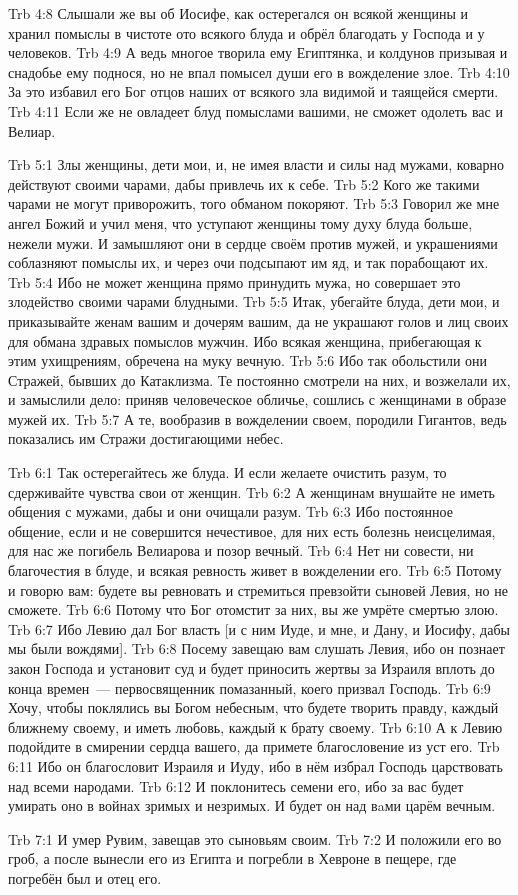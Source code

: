\vs Trb 4:8
Слышали же вы об Иосифе, как остерегался он всякой женщины
и хранил помыслы в чистоте ото всякого блуда и обрёл
благодать у Господа и у человеков.
\vs Trb 4:9
А ведь многое творила ему Египтянка, и колдунов призывая
и снадобье ему поднося, но не впал помысел души его
в вожделение злое.
\vs Trb 4:10
За это избавил его Бог отцов наших от всякого зла видимой
и таящейся смерти.
\vs Trb 4:11
Если же не овладеет блуд помыслами вашими, не сможет одолеть вас и Велиар.

\vs Trb 5:1
Злы женщины, дети мои, и, не имея власти и силы над мужами,
коварно действуют своими чарами, дабы привлечь их к себе.
\vs Trb 5:2
Кого же такими чарами не могут приворожить, того обманом покоряют.
\vs Trb 5:3
Говорил же мне ангел Божий и учил меня, что уступают женщины тому духу
блуда больше, нежели мужи.
И замышляют они в сердце своём против мужей,
и украшениями соблазняют помыслы их,
и через очи подсыпают им яд, и так порабощают их.
\vs Trb 5:4
Ибо не может женщина прямо принудить мужа,
но совершает это злодейство своими чарами блудными.
\vs Trb 5:5
Итак, убегайте блуда, дети мои,
и приказывайте женам вашим и дочерям вашим,
да не украшают голов и лиц своих для обмана здравых помыслов мужчин.
Ибо всякая женщина, прибегающая к этим ухищрениям,
обречена на муку вечную.
\vs Trb 5:6
Ибо так обольстили они Стражей, бывших до
Катаклизма.
Те постоянно смотрели на них, и возжелали их,
и замыслили дело: приняв человеческое обличье, сошлись с
женщинами в образе мужей их.
\vs Trb 5:7
А те, вообразив в вожделении своем, породили Гигантов,
ведь показались им Стражи достигающими небес.

\vs Trb 6:1
Так остерегайтесь же блуда.
И если желаете очистить разум, то сдерживайте чувства
свои от женщин.
\vs Trb 6:2
А женщинам внушайте не иметь общения с мужами,
дабы и они очищали  разум.
\vs Trb 6:3
Ибо постоянное общение,
если и не совершится нечестивое,
для них есть болезнь неисцелимая,
для нас же погибель Велиарова и позор вечный.
\vs Trb 6:4
Нет ни совести, ни благочестия в блуде,
и всякая ревность живет в вожделении его.
\vs Trb 6:5
Потому и говорю вам:
будете вы ревновать и стремиться превзойти сыновей Левия,
но не сможете.
\vs Trb 6:6
Потому что Бог отомстит за них, вы же умрёте смертью злою.
\vs Trb 6:7
Ибо Левию дал Бог власть
[и с ним Иуде, и мне, и Дану, и Иосифу, дабы мы были вождями].
\vs Trb 6:8
Посему завещаю вам слушать Левия, ибо он познает закон Господа
и установит суд и будет приносить жертвы за Израиля вплоть
до конца времен~--- первосвященник помазанный,
коего призвал Господь.
\vs Trb 6:9
Хочу, чтобы поклялись вы Богом небесным, что будете творить правду,
каждый ближнему своему, и иметь любовь, каждый к брату своему.
\vs Trb 6:10
А к Левию подойдите в смирении сердца вашего,
да примете благословение из уст его.
\vs Trb 6:11
Ибо он благословит Израиля и Иуду,
ибо в нём избрал Господь царствовать над всеми народами.
\vs Trb 6:12
И поклонитесь семени его, ибо за вас будет умирать оно в
войнах зримых и незримых.
И будет он над вaми царём вечным.

\vs Trb 7:1
И умер Рувим, завещав это сыновьям своим.
\vs Trb 7:2
И положили его во гроб, а после вынесли его из Египта
и погребли в Хевроне в пещере, где погребён был и отец его.
